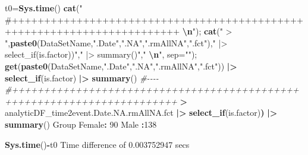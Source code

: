 \documentclass[
]{article}
\newenvironment{Shaded}{\begin{snugshade}}{\end{snugshade}}
\newcommand{\AttributeTok}[1]{\textcolor[rgb]{0.13,0.29,0.53}{#1}}
\newcommand{\CommentTok}[1]{\textcolor[rgb]{0.56,0.35,0.01}{\textit{#1}}}
\newcommand{\DecValTok}[1]{\textcolor[rgb]{0.00,0.00,0.81}{#1}}
\newcommand{\ErrorTok}[1]{\textcolor[rgb]{0.64,0.00,0.00}{\textbf{#1}}}
\newcommand{\FloatTok}[1]{\textcolor[rgb]{0.00,0.00,0.81}{#1}}
\newcommand{\FunctionTok}[1]{\textcolor[rgb]{0.13,0.29,0.53}{\textbf{#1}}}
\newcommand{\NormalTok}[1]{#1}
\newcommand{\OtherTok}[1]{\textcolor[rgb]{0.56,0.35,0.01}{#1}}
\newcommand{\SpecialCharTok}[1]{\textcolor[rgb]{0.81,0.36,0.00}{\textbf{#1}}}
\newcommand{\StringTok}[1]{\textcolor[rgb]{0.31,0.60,0.02}{#1}}
\begin{document}
\begin{Shaded}
\begin{Highlighting}[]

\NormalTok{t0}\OtherTok{=}\FunctionTok{Sys.time}\NormalTok{()}
\FunctionTok{cat}\NormalTok{(}\StringTok{"   \#++++++++++++++++++++++++++++++++++++++++++++++++++++++++++++++++++++++++    }\SpecialCharTok{\textbackslash{}n}\StringTok{"}\NormalTok{); }\FunctionTok{cat}\NormalTok{(}\StringTok{" \textgreater{} "}\NormalTok{,}\FunctionTok{paste0}\NormalTok{(DataSetName,}\StringTok{".Date"}\NormalTok{,}\StringTok{".NA"}\NormalTok{,}\StringTok{".rmAllNA"}\NormalTok{,}\StringTok{".fct"}\NormalTok{),}\StringTok{" |\textgreater{} select\_if(is.factor))"}\NormalTok{,}\StringTok{" |\textgreater{} summary()"}\NormalTok{,}\StringTok{"  }\SpecialCharTok{\textbackslash{}n}\StringTok{"}\NormalTok{, }\AttributeTok{sep=}\StringTok{""}\NormalTok{); }\FunctionTok{get}\NormalTok{(}\FunctionTok{paste0}\NormalTok{(DataSetName,}\StringTok{".Date"}\NormalTok{,}\StringTok{".NA"}\NormalTok{,}\StringTok{".rmAllNA"}\NormalTok{,}\StringTok{".fct"}\NormalTok{)) }\SpecialCharTok{|\textgreater{}} \FunctionTok{select\_if}\NormalTok{(is.factor) }\SpecialCharTok{|\textgreater{}} \FunctionTok{summary}\NormalTok{() }\CommentTok{\#{-}{-}{-}{-}  }
   \CommentTok{\#++++++++++++++++++++++++++++++++++++++++++++++++++++++++++++++++++++++++    }
 \SpecialCharTok{\textgreater{}}\NormalTok{ analyticDF\_time2event.Date.NA.rmAllNA.fct }\SpecialCharTok{|\textgreater{}} \FunctionTok{select\_if}\NormalTok{(is.factor)}\ErrorTok{)} \SpecialCharTok{|\textgreater{}} \FunctionTok{summary}\NormalTok{()  }
\NormalTok{    Group    }
\NormalTok{ Female}\SpecialCharTok{:} \DecValTok{90}  
\NormalTok{ Male  }\SpecialCharTok{:}\DecValTok{138}  
\end{Highlighting}
\end{Shaded}

\begin{Shaded}
\begin{Highlighting}[]
\FunctionTok{Sys.time}\NormalTok{()}\SpecialCharTok{{-}}\NormalTok{t0}
\NormalTok{Time difference of }\FloatTok{0.003752947}\NormalTok{ secs}
\end{Highlighting}
\end{Shaded}
\end{document}
